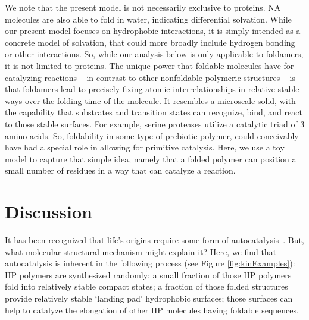 \documentclass[journal=jacsat,manuscript=article,layout=twocolumn]{achemso}
\begin{document}
We note that the present model is not necessarily exclusive to proteins.  NA molecules are also able 
to fold in water, indicating differential solvation.  While our present model focuses on hydrophobic 
interactions, it is simply intended as a concrete model of solvation, that could more broadly 
include hydrogen bonding or other interactions.  So, while our 
analysis below is only applicable to foldamers, it is not limited to proteins.  The unique power 
that foldable molecules have for catalyzing reactions -- in contrast to other nonfoldable polymeric 
structures -- is that foldamers lead to precisely fixing atomic interrelationships in relative 
stable ways over the folding time of the molecule.  It resembles a 
microscale solid, with the capability that substrates and transition states can recognize, bind, and 
react to those stable surfaces. For example, serine proteases utilize a catalytic triad of 3 amino 
acids.  So, foldability in some type of prebiotic polymer, could conceivably have had a special role 
in allowing for primitive catalysis.  Here, we use a toy model to capture that simple idea, namely 
that a folded polymer can position a small number of residues in a way that can catalyze a reaction.



\section{Discussion}
\label{sec:evolution}
 It has been recognized that life's origins require some form of 
autocatalysis~\cite{Kauffman1986,Dyson1985,Eigen1978}.  But, what molecular structural mechanism 
might explain it?  Here, we find that autocatalysis is inherent in the following process (see 
Figure \ref{fig:kinExamples}):  HP polymers 
are synthesized randomly; a small fraction of those HP polymers fold into relatively stable 
compact 
states; a fraction of those folded structures provide relatively stable `landing pad' hydrophobic 
surfaces; those surfaces can help to catalyze the elongation of other HP molecules having foldable 
sequences.
\end{document}

